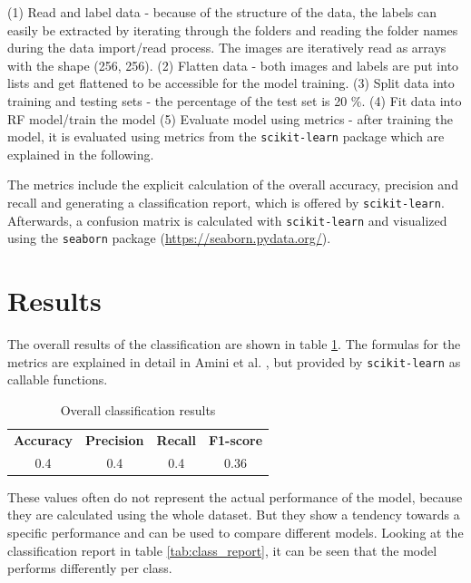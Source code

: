 \documentclass[oneside,twocolumn,10pt,cleanfoot,cleanhead]{asme2ej}
\begin{document}
(1) Read and label data - 
because of the structure of the data, the labels can easily be extracted by iterating through the folders and reading the folder names during the data import/read process.
The images are iteratively read as arrays with the shape (256, 256).
(2) Flatten data - 
both images and labels are put into lists and get flattened to be accessible for the model training.
(3) Split data into training and testing sets - 
the percentage of the test set is 20 \%.
(4) Fit data into RF model/train the model
(5) Evaluate model using metrics - 
after training the model, it is evaluated using metrics from the \texttt{scikit-learn} package which are explained in the following.

The metrics include the explicit calculation of the overall accuracy, precision and recall and generating a classification report, which is offered by \texttt{scikit-learn}.
Afterwards, a confusion matrix is calculated with \texttt{scikit-learn} and visualized using the \texttt{seaborn} package (\url{https://seaborn.pydata.org/}).


\section{Results}

The overall results of the classification are shown in table \ref{tab:overall_results}.
The formulas for the metrics are explained in detail in Amini et al. \cite{AminiEA2022}, but provided by \texttt{scikit-learn} as callable functions.

\begin{table}[ht]
    \caption{Overall classification results}
    \begin{center}
        \label{tab:overall_results}
        \begin{tabular}{c c c c}
            & & \\
            \hline
            \textbf{Accuracy} & \textbf{Precision} & \textbf{Recall} & \textbf{F1-score} \\
            \hline
            0.4 & 0.4 & 0.4 & 0.36 \\
            \hline
        \end{tabular}
    \end{center}
\end{table}

These values often do not represent the actual performance of the model, because they are calculated using the whole dataset.
But they show a tendency towards a specific performance and can be used to compare different models.
Looking at the classification report in table \ref{tab:class_report}, it can be seen that the model performs differently per class.
\end{document}
